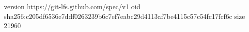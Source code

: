 version https://git-lfs.github.com/spec/v1
oid sha256:c205df6536e7ddf0263239b6c7ef7eabc29d4113af7be4115c57c54fc17fcf6c
size 21960

